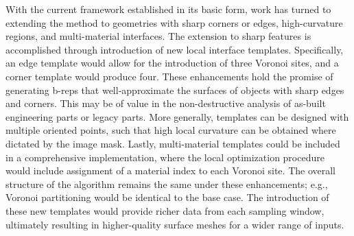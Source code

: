 %
With the current framework established in its basic form, work has turned to extending the method to geometries with sharp corners or edges, high-curvature regions, and multi-material interfaces. The extension to sharp features is accomplished through introduction of new local interface templates. Specifically, an edge template would allow for the introduction of three Voronoi sites, and a corner template would produce four. These enhancements hold the promise of generating b-reps that well-approximate the surfaces of objects with sharp edges and corners. This may be of value in the non-destructive analysis of as-built engineering parts or legacy parts. More generally, templates can be designed with multiple oriented points, such that high local curvature can be obtained where dictated by the image mask.  Lastly, multi-material templates could be included in a comprehensive implementation, where the local optimization procedure would include assignment of a material index to each Voronoi site. The overall structure of the algorithm remains the same under these enhancements; e.g., Voronoi partitioning would be identical to the base case. The introduction of these new templates would provide richer data from each sampling window, ultimately resulting in higher-quality surface meshes for a wider range of inputs.